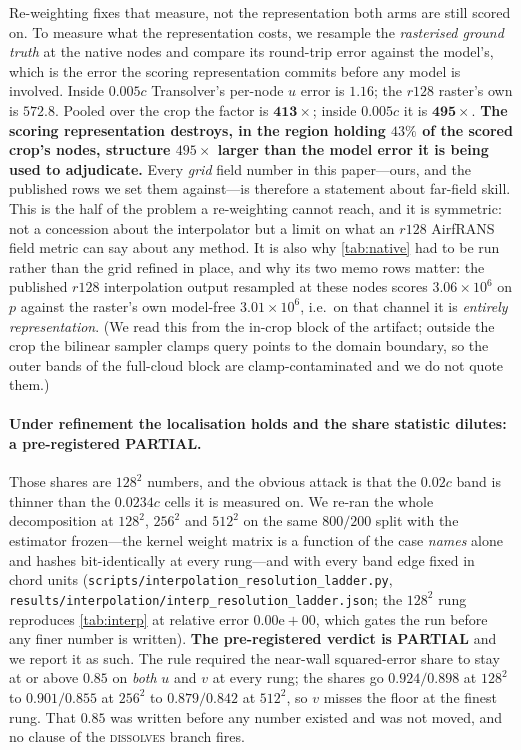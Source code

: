 Re-weighting fixes that measure, not the representation both arms are still scored on. To
measure what the representation costs, we resample the \emph{rasterised ground truth} at the native
nodes and compare its round-trip error against the model's, which is the error the scoring
representation commits before any model is involved. Inside $0.005c$ Transolver's per-node
$u$ error is $1.16$; the $r128$ raster's own is $\mathbf{572.8}$. Pooled over the crop the
factor is $\mathbf{413\times}$; inside $0.005c$ it is $\mathbf{495\times}$. \textbf{The
scoring representation destroys, in the region holding $43\%$ of the scored crop's nodes,
structure $495\times$ larger than the model error it is being used to adjudicate.} Every
\emph{grid} field number in this paper---ours, and the published rows we set them
against---is therefore a statement about far-field skill. This is the half of the problem
a re-weighting cannot reach, and it is symmetric: not a concession about the interpolator
but a limit on what an $r128$ AirfRANS field metric can say about any method. It is also
why \autoref{tab:native} had to be run rather than the grid refined in place, and why its
two memo rows matter: the published $r128$ interpolation output resampled at these nodes
scores $3.06{\times}10^{6}$ on $p$ against the raster's own model-free $3.01{\times}10^{6}$,
i.e.\ on that channel it is \emph{entirely representation}. (We read this from the in-crop
block of the artifact; outside the crop the bilinear sampler clamps query points to the
domain boundary, so the outer bands of the full-cloud block are clamp-contaminated and we
do not quote them.)

\paragraph{Under refinement the localisation holds and the share statistic dilutes: a
pre-registered PARTIAL.} Those shares are $128^2$ numbers, and the obvious attack
is that the $0.02c$ band is thinner than the $0.0234c$ cells it is measured on. We re-ran
the whole decomposition at $128^2$, $256^2$ and $512^2$ on the same $800/200$ split with
the estimator frozen---the kernel weight matrix is a function of the case \emph{names}
alone and hashes bit-identically at every rung---and with every band edge fixed in chord
units (\texttt{scripts\slash{}interpolation\_resolution\_ladder.py},
\texttt{results\slash{}interpolation\slash{}interp\_resolution\_ladder.json}; the $128^2$ rung reproduces
\autoref{tab:interp} at relative error $0.00\mathrm{e}{+}00$, which gates the run before any
finer number is written). \textbf{The pre-registered verdict is PARTIAL} and we
report it as such. The rule required the near-wall squared-error share to stay at or above
$0.85$ on \emph{both} $u$ and $v$ at every rung; the shares go $0.924/0.898$ at $128^2$ to
$0.901/0.855$ at $256^2$ to $\mathbf{0.879}/\mathbf{0.842}$ at $512^2$, so $v$ misses the
floor at the finest rung. That $0.85$ was written before any number existed and was not
moved, and no clause of the \textsc{dissolves} branch fires.

